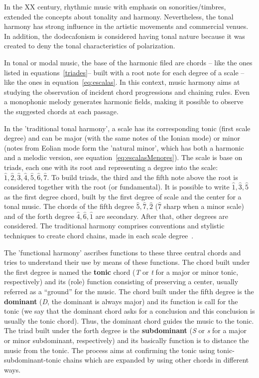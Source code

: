 \documentclass[
 aip,
 jmp,
 amsmath,amssymb,
 reprint,
]{revtex4-1}
\begin{document}
In the XX century, rhythmic music with emphasis on sonorities/timbres, extended
the concepts about tonality and harmony. Nevertheless, the
tonal harmony has strong influence in the artistic movements and commercial
venues. In addition, the dodecafonism is considered having tonal nature because it
was created to deny the tonal characteristics of polarization.

In tonal or modal music, the base of the harmonic filed are chords -- like the ones listed in
equations~\ref{triades}-- built with a root note for each degree of a scale -- like
the ones in equation~\ref{eq:escalas}. In this context, music harmony aims at studying the observation of incident chord progressions and chaining rules. Even a monophonic melody generates harmonic fields, making it possible to observe the suggested chords at each passage.

In the 'traditional tonal harmony', a scale has its corresponding tonic (first scale
degree) and can be major (with the same notes of the Ionian mode) or
minor (notes from Eolian mode form the 'natural minor', which has both a
harmonic and a melodic version, see equation~\ref{eq:escalasMenores}). The
scale is base on triads, each one with its root and representing a degree into
the scale: $\hat{1},\hat{2},\hat{3},\hat{4},\hat{5},\hat{6},\hat{7}$. 
To build triads, the third and the fifth note above the root is considered together with the root (or fundamental). It is possible to write $\hat{1},\hat{3},\hat{5}$ as the first degree chord, built by the first degree of scale and the center for a tonal music. The chords
of the fifth degree $\hat{5},\hat{7},\hat{2}$ ($\hat{7}$ sharp when a minor
scale) and of the forth degree $\hat{4},\hat{6},\hat{1}$ are secondary. After
that, other degrees are considered. The traditional harmony comprises conventions and stylistic techniques to create chord chains, made in each scale degree~\cite{Harmonia}. 

The 'functional harmony' ascribes functions to these three central chords and
tries to understand their use by means of these functions. The chord built under
the first degree is named the \textbf{tonic} chord (\textit{T} or \textit{t} for a major or minor tonic, respectively) and its (role) function consisting of preserving a center, usually referred as a ``ground'' for the music. The chord built under the fifth degree is the \textbf{dominant} (\textit{D}, the dominant is always major) and its function is call for the tonic (we say that the dominant chord asks for a conclusion and this conclusion is usually the tonic chord). Thus, the dominant chord guides the music to the tonic. The triad built under the forth degree is the \textbf{subdominant} (\textit{S} or \textit{s} for a major or minor
subdominant, respectively) and its basically function is to distance the music from the tonic. The process aims at confirming the tonic using tonic-subdominant-tonic chains which are
expanded by using other chords in different ways.
\end{document}
